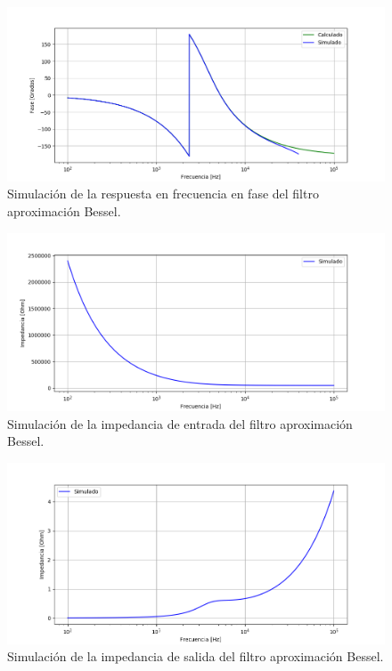 \begin{figure}[H]
\centering
	\centering
	\includegraphics[width=\textwidth]{Imagenes-Ej1/bessel_hspha_sim.png}
	\caption{Simulación de la respuesta en frecuencia en fase del filtro aproximación Bessel.}
	\label{bes_phase_sim}
\end{figure}

\begin{figure}[H]
\centering
	\centering
	\includegraphics[width=\textwidth]{Imagenes-Ej1/bessel_zin_sim.png}
	\caption{Simulación de la impedancia de entrada del filtro aproximación Bessel.}
	\label{bes_zin_sim}
\end{figure}

\begin{figure}[H]
\centering
	\centering
	\includegraphics[width=\textwidth]{Imagenes-Ej1/bessel_zout_sim.png}
	\caption{Simulación de la impedancia de salida del filtro aproximación Bessel.}
	\label{bes_zout_sim}
\end{figure}

